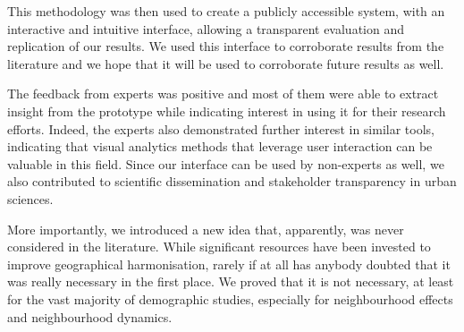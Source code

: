 \documentclass[10pt,letterpaper]{article}
\newcommand{\censure}[1]{}
\begin{document}
This methodology was then used to create a publicly accessible system, with an
interactive and intuitive interface, allowing a transparent evaluation and
replication of our results. We used this interface to corroborate results from
the literature and we hope that it will be used to corroborate future results as
well. 

The feedback from experts was positive and most of them were able to extract
insight from the prototype while indicating interest in using it for their
research efforts. Indeed, the experts also demonstrated further interest in
similar tools, indicating that visual analytics methods that leverage user
interaction can be valuable in this field.  Since our interface can be used by
non-experts as well, we also contributed to scientific dissemination and
stakeholder transparency in urban sciences.


More importantly, we introduced a new idea that, apparently, was never
considered in the literature. While significant resources have been invested to
improve geographical harmonisation, rarely if at all has anybody doubted that it
was really necessary in the first place. We proved that it is not necessary, at
least for the vast majority of demographic studies, especially for
neighbourhood effects and neighbourhood dynamics.

\censure{
\section*{Acknowledgement}
This research was supported by a University of Toronto Connaught Global
Challenge grant and is part of the Urban Genome Project. The authors thank Cary
Wu, Ethan Fosse, Fernando Calderón Figueroa, Patrick Adler, and James Murdoch
for their expert opinions; Mark S. Fox, Robert M. Wright, Ultan Byrne, Matti
Siemiatycki, Shauna Brail, and Richard Florida for general guidance and support;
and the anonymous reviewers for their constructive comments.
}



\end{document}
